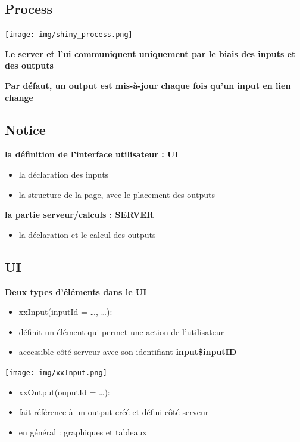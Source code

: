 \documentclass[
]{article}
\providecommand{\tightlist}{%
  \setlength{\itemsep}{0pt}\setlength{\parskip}{0pt}}
\begin{document}
\hypertarget{process}{%
\subsection{Process}\label{process}}

\texttt{[image: img/shiny\_process.png]}

\textbf{Le server et l'ui communiquent uniquement par le biais des
inputs et des outputs}

\textbf{Par défaut, un output est mis-à-jour chaque fois qu'un input en
lien change}

\hypertarget{notice}{%
\subsection{Notice}\label{notice}}

\textbf{la définition de l'interface utilisateur : UI}

\begin{itemize}
\tightlist
\item
  la déclaration des inputs
\item
  la structure de la page, avec le placement des outputs
\end{itemize}

\textbf{la partie serveur/calculs : SERVER}

\begin{itemize}
\tightlist
\item
  la déclaration et le calcul des outputs
\end{itemize}

\hypertarget{ui}{%
\subsection{UI}\label{ui}}

\textbf{Deux types d'éléments dans le UI}

\begin{itemize}
\item
  xxInput(inputId = \ldots, \ldots):
\item
  définit un élément qui permet une action de l'utilisateur
\item
  accessible côté serveur avec son identifiant \textbf{input\$inputID}
\end{itemize}

\texttt{[image: img/xxInput.png]}

\begin{itemize}
\item
  xxOutput(ouputId = \ldots):
\item
  fait référence à un output créé et défini côté serveur
\item
  en général : graphiques et tableaux
\end{itemize}
\end{document}
